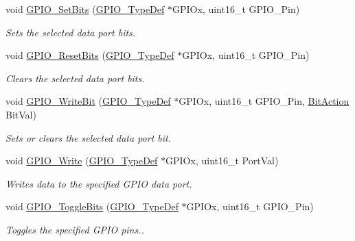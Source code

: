 \begin{DoxyCompactItemize}
void \hyperlink{group___g_p_i_o___group2_ga9e1352eed7c6620e18af2d86f6b6ff8e}{G\+P\+I\+O\+\_\+\+Set\+Bits} (\hyperlink{struct_g_p_i_o___type_def}{G\+P\+I\+O\+\_\+\+Type\+Def} $\ast$G\+P\+I\+Ox, uint16\+\_\+t G\+P\+I\+O\+\_\+\+Pin)
\begin{DoxyCompactList}\small\item\em Sets the selected data port bits. \end{DoxyCompactList}\item 
void \hyperlink{group___g_p_i_o___group2_ga6fcd35b207a66608dd2c9d7de9247dc8}{G\+P\+I\+O\+\_\+\+Reset\+Bits} (\hyperlink{struct_g_p_i_o___type_def}{G\+P\+I\+O\+\_\+\+Type\+Def} $\ast$G\+P\+I\+Ox, uint16\+\_\+t G\+P\+I\+O\+\_\+\+Pin)
\begin{DoxyCompactList}\small\item\em Clears the selected data port bits. \end{DoxyCompactList}\item 
void \hyperlink{group___g_p_i_o___group2_ga8f7b237fd744d9f7456fbe0da47a9b80}{G\+P\+I\+O\+\_\+\+Write\+Bit} (\hyperlink{struct_g_p_i_o___type_def}{G\+P\+I\+O\+\_\+\+Type\+Def} $\ast$G\+P\+I\+Ox, uint16\+\_\+t G\+P\+I\+O\+\_\+\+Pin, \hyperlink{group___g_p_i_o_ga176130b21c0e719121470a6042d4cf19}{Bit\+Action} Bit\+Val)
\begin{DoxyCompactList}\small\item\em Sets or clears the selected data port bit. \end{DoxyCompactList}\item 
void \hyperlink{group___g_p_i_o___group2_gaa925f19c8547a00c7a0c269a84873bf9}{G\+P\+I\+O\+\_\+\+Write} (\hyperlink{struct_g_p_i_o___type_def}{G\+P\+I\+O\+\_\+\+Type\+Def} $\ast$G\+P\+I\+Ox, uint16\+\_\+t Port\+Val)
\begin{DoxyCompactList}\small\item\em Writes data to the specified G\+P\+IO data port. \end{DoxyCompactList}\item 
void \hyperlink{group___g_p_i_o___group2_gac1b837c66258872740d5f89f23549ab1}{G\+P\+I\+O\+\_\+\+Toggle\+Bits} (\hyperlink{struct_g_p_i_o___type_def}{G\+P\+I\+O\+\_\+\+Type\+Def} $\ast$G\+P\+I\+Ox, uint16\+\_\+t G\+P\+I\+O\+\_\+\+Pin)
\begin{DoxyCompactList}\small\item\em Toggles the specified G\+P\+IO pins.. \end{DoxyCompactList}\end{DoxyCompactItemize}


